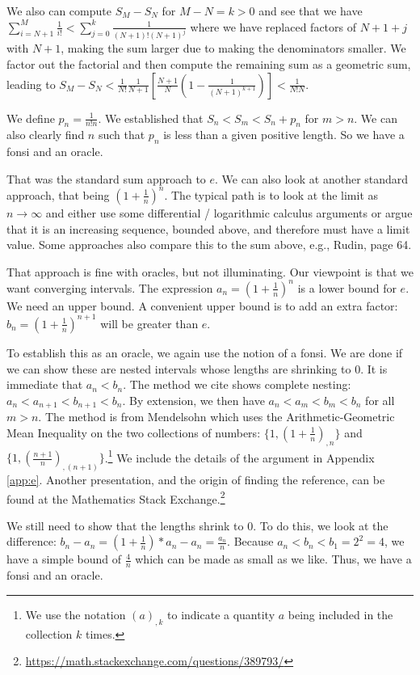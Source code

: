 \documentclass[12pt]{article}
\begin{document}
We also can compute $S_M - S_N$ for $M - N = k > 0$ and see that we have $\sum_{i=N+1}^M \frac{1}{i!} <  \sum_{j=0}^k  \frac{1}{(N+1)!(N+1)^j} $ where we have replaced factors of $N+1 + j$ with $N+1$, making the sum larger due to making the denominators smaller. We factor out the factorial and then compute the remaining sum as a geometric sum, leading to $S_M - S_N < \frac{1}{N!} \frac{1}{N+1} [\frac{N+1}{N} (1 - \frac{1}{(N+1)^{k+1}} )] < \frac{1}{N! N}$.

We define $p_n = \frac{1}{n!n}$. We established that $S_n < S_m < S_n + p_n$ for $m> n$. We can also clearly find $n$ such that $p_n$ is less than a given positive length. So we have a fonsi and an oracle. 

That was the standard sum approach to $e$. We can also look at another standard approach, that being $(1+\frac{1}{n})^n$. The typical path is to look at the limit as $n\to \infty$ and either use some differential / logarithmic calculus arguments or argue that it is an increasing sequence, bounded above, and therefore must have a limit value. Some approaches also compare this to the sum above, e.g., Rudin\cite{rudin}, page 64. 

That approach is fine with oracles, but not illuminating. Our viewpoint is that we want converging intervals. The expression $a_n = (1+\frac{1}{n})^n$ is a lower bound for $e$. We need an upper bound. A convenient upper bound is to add an extra factor: $b_n = (1+\frac{1}{n})^{n+1}$ will be greater than $e$. 

To establish this as an oracle, we again use the notion of a fonsi. We are done if we can show these are nested intervals whose lengths are shrinking to 0. It is immediate that $a_n < b_n$. The method we cite shows complete nesting: $a_n < a_{n+1} < b_{n+1} < b_n$. By extension, we then have $a_n < a_m < b_m < b_n$ for all $m > n$. The method is from Mendelsohn \cite{mend} which uses the Arithmetic-Geometric Mean Inequality on the two collections of numbers: $\{1, (1+ \frac{1}{n})_{,n} \}$ and $\{1, (\frac{n+1}{n})_{,(n+1)}\}$.\footnote{We use the notation $(a)_{,k}$ to indicate a quantity $a$ being included in the collection $k$ times.} We include the details of the argument in Appendix \ref{app:e}.  Another presentation, and the origin of finding the reference, can be found at the Mathematics Stack Exchange.\footnote{ \url{https://math.stackexchange.com/questions/389793/}}

We still need to show that the lengths shrink to 0. To do this, we look at the difference: $b_n - a_n = (1+\tfrac{1}{n})*a_n - a_n = \tfrac{a_n}{n}$. Because $a_n < b_n < b_1=2^2 = 4$, we have a simple bound of $\tfrac{4}{n}$ which can be made as small as we like. Thus, we have a fonsi and an oracle. 
\end{document}

